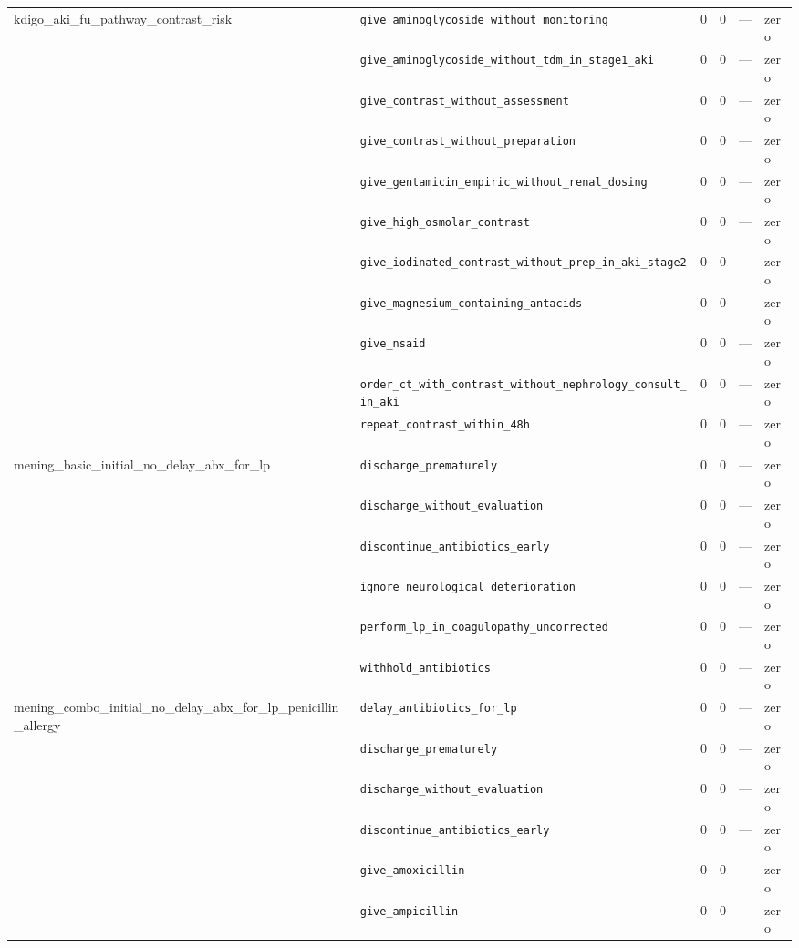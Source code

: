 \begin{table}[ht]
\begin{tabular}{llrrrl}
kdigo\_aki\_fu\_pathway\_contrast\_risk & \texttt{give\_aminoglycoside\_without\_monitoring} & 0 & 0 & — & zero \\
 & \texttt{give\_aminoglycoside\_without\_tdm\_in\_stage1\_aki} & 0 & 0 & — & zero \\
 & \texttt{give\_contrast\_without\_assessment} & 0 & 0 & — & zero \\
 & \texttt{give\_contrast\_without\_preparation} & 0 & 0 & — & zero \\
 & \texttt{give\_gentamicin\_empiric\_without\_renal\_dosing} & 0 & 0 & — & zero \\
 & \texttt{give\_high\_osmolar\_contrast} & 0 & 0 & — & zero \\
 & \texttt{give\_iodinated\_contrast\_without\_prep\_in\_aki\_stage2} & 0 & 0 & — & zero \\
 & \texttt{give\_magnesium\_containing\_antacids} & 0 & 0 & — & zero \\
 & \texttt{give\_nsaid} & 0 & 0 & — & zero \\
 & \texttt{order\_ct\_with\_contrast\_without\_nephrology\_consult\_in\_aki} & 0 & 0 & — & zero \\
 & \texttt{repeat\_contrast\_within\_48h} & 0 & 0 & — & zero \\
\midrule
mening\_basic\_initial\_no\_delay\_abx\_for\_lp & \texttt{discharge\_prematurely} & 0 & 0 & — & zero \\
 & \texttt{discharge\_without\_evaluation} & 0 & 0 & — & zero \\
 & \texttt{discontinue\_antibiotics\_early} & 0 & 0 & — & zero \\
 & \texttt{ignore\_neurological\_deterioration} & 0 & 0 & — & zero \\
 & \texttt{perform\_lp\_in\_coagulopathy\_uncorrected} & 0 & 0 & — & zero \\
 & \texttt{withhold\_antibiotics} & 0 & 0 & — & zero \\
\midrule
mening\_combo\_initial\_no\_delay\_abx\_for\_lp\_penicillin\_allergy & \texttt{delay\_antibiotics\_for\_lp} & 0 & 0 & — & zero \\
 & \texttt{discharge\_prematurely} & 0 & 0 & — & zero \\
 & \texttt{discharge\_without\_evaluation} & 0 & 0 & — & zero \\
 & \texttt{discontinue\_antibiotics\_early} & 0 & 0 & — & zero \\
 & \texttt{give\_amoxicillin} & 0 & 0 & — & zero \\
 & \texttt{give\_ampicillin} & 0 & 0 & — & zero \\

\end{tabular}
\end{table}
